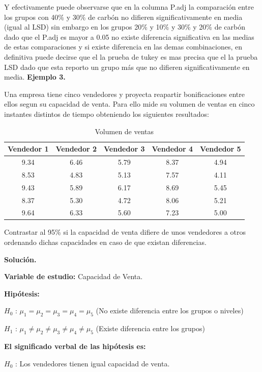 \documentclass[12pt,letterpaper]{report}
\begin{document}
Y efectivamente puede observarse que en la columna P.adj la comparación entre los grupos con 40\% y 30\% de carbón no difieren significativamente en media (igual al LSD) sin embargo en los grupos 20\% y 10\% y 30\% y 20\% de carbón  dado que el P.adj es mayor a 0.05 no existe diferencia significativa en las medias de estas comparaciones y si existe diferencia en las demas combinaciones, en definitiva puede decirse que el la prueba de tukey es mas precisa que el la prueba LSD dado que esta reporto un grupo más que no difieren significativamente en media.
\newpage
\textbf{Ejemplo 3.}

Una empresa tiene cinco vendedores y proyecta reapartir bonificaciones entre ellos segun su capacidad de venta. Para ello mide su volumen de ventas en cinco instantes distintos de tiempo obteniendo los siguientes resultados:

\begin{table}[htb]
\centering
\begin{tabular}{||c|c|c|c|c||}
\hline
\hline
 Vendedor 1  & Vendedor 2 & Vendedor 3 & Vendedor 4 & Vendedor 5\\
\hline
9.34 & 6.46 & 5.79 & 8.37 & 4.94 \\
8.53 & 4.83 & 5.13 & 7.57 & 4.11 \\
9.43 & 5.89 & 6.17 & 8.69 & 5.45 \\
8.37 & 5.30 & 4.72 & 8.06 & 5.21  \\
9.64 & 6.33 & 5.60 & 7.23 & 5.00  \\
\hline
\hline
\end{tabular}
\caption{Volumen de ventas}
\end{table}

Contrastar al 95\% si la capacidad de venta difiere de unos vendedores a otros ordenando dichas capacidades en caso de que existan diferencias.

\textbf{Solución.}

\textbf{Variable de estudio:} Capacidad de Venta.

\textbf{Hipótesis:}

$H_{0}$ : $\mu_1 = \mu_2 = \mu_3 = \mu_4 = \mu_5$ (No existe diferencia entre los grupos o niveles)

$H_{1}$ : $\mu_1 \not= \mu_2 \not= \mu_3 \not= \mu_4 \not= \mu_5$ (Existe diferencia entre los grupos)

\textbf{El significado verbal de las hipótesis es:}

\textbf{$H_{0}$} : Los vendedores tienen igual capacidad de venta. 
\end{document}
